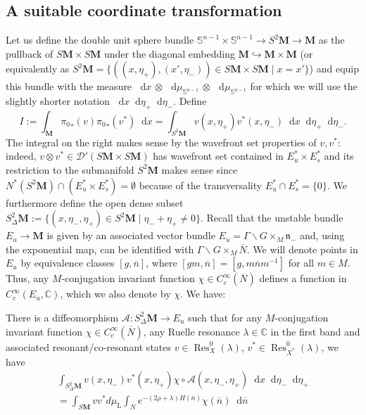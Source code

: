 \documentclass[AHL, Unicode, longabstracts, published]{cedram}
\DeclareMathOperator{\Res}{Res}
\newcommand{\rml}{\mathrm{L}}
\newcommand{\mc}{\mathcal}
\newcommand{\cc}{\mathbb{C}}
\newcommand{\bfm}{\mathbf{M}}
\newcommand{\x}{\times}
\newcommand{\intd}{\mathop{}\!\mathrm{d}}
\newcommand{\n}{\mathfrak n}
\newcommand{\bn}{{\overline{n}}}
\newcommand{\bN}{{\overline{N}}}
\begin{document}
\subsection{A suitable coordinate transformation}

Let us define the double unit sphere bundle $\mathbb S^ {n-1}\times \mathbb S^ {n-1}\to S^2\mathbf{M}\to \mathbf M$ as the pullback of $S\mathbf M\times S\mathbf M$ under the diagonal embedding $\mathbf M \hookrightarrow \mathbf M\times\mathbf M$ (or equivalently as $S^2\bfm=\{((x,\eta_+),(x',\eta_-))\in S{\bfm}\x S{\bfm}\mid x=x'\}$) and equip this bundle with the measure $\intd x\,\otimes\,\intd{\mu}_{\mathbb S^{n-1}}\,\otimes\,\intd{\mu}_{\mathbb S^{n-1}}$ for which we will use the slightly shorter notation $\intd x\intd \eta_+\intd\eta_-$. Define
\[
I:=\int_{\mathbf M} {\pi_0}_*(v) {\pi_0}_*(v^*) \intd x = \int_{S^2\mathbf M} v(x,\eta_+)v^*(x,\eta_-) \intd x\intd \eta_+\intd\eta_-.
\]
The integral on the right makes sense by the wavefront set properties of $v,v^*$: indeed, $v\otimes v^*\in \mc{D}'(S{\bfm}\x S{\bfm})$ has wavefront set contained in $E_u^* \x E_s^*$ and its restriction to the submanifold $S^2{\bfm}$ makes sense since $N^*(S^2{\bfm})\cap (E_u^* \x E_s^*)=\emptyset$ because of the transversality $E_u^*\cap E_s^*=\{0\}$. We furthermore define the open dense subset $S^2_\Delta\mathbf M := \{(x,\eta_-,\eta_+)\in S^2\mathbf M \mid \eta_-+\eta_+ \neq 0\}$. Recall that the unstable bundle $E_u\to\mathbf M$ is given by an associated vector bundle $E_u = \Gamma\backslash G\times_M\n_-$ and, using the exponential map, can be identified with $\Gamma\backslash G\times_M\bN$. We will denote points in $E_u$ by equivalence classes $[g,\overline n]$, where $[gm,\bn]= [g,m\bn m^{-1}]$ for all $m\in M$. Thus, any $M$-conjugation invariant function $\chi\in C_c^\infty(\bN)$ defines a function in $C_c^\infty(E_u,\cc)$, which we also denote by $\chi$. We have:

\begin{lemm}\label{lem:pairing_coordinate}
There is a diffeomorphism $\mathcal A :S^{2}_\Delta \mathbf M \to E_u$ such that for any $M$-conjugation invariant function $\chi\in C_c^\infty(\bN)$, any Ruelle resonance $\lambda\in\cc$ in the first band and associated resonant/co-resonant states $v\in \Res^0_X(\lambda)$, $v^ *\in \Res^0_{X^*}(\lambda)$, we have
\begin{multline}\label{eq:pairing_coordinate}
\int_{S^2_\Delta \mathbf M} v(x,\eta_-)v^*(x,\eta_+)\chi\circ\mathcal A (x,\eta_-,\eta_+)\intd x\intd \eta_- \intd \eta_+ \\
=\int_{S\mathbf M} v v^*d\mu_{\rml}\int_{\bN} e^{-(2\rho+\lambda)H(\bn)}\chi(\bn) \intd \bn
\end{multline}
\end{lemm}
\end{document}
